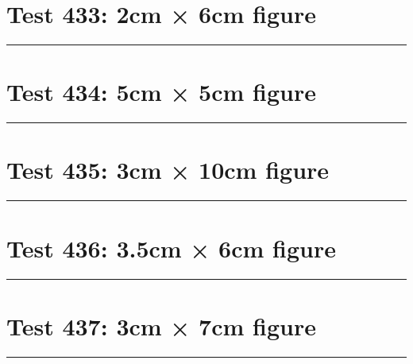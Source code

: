\documentclass[a4paper,11pt]{article}
\begin{document}
\section*{Test 433: 2cm × 6cm figure}
\begin{swarmwrap}%
  \begin{minipage}[t]{2cm}
    \centering
    \rule{\linewidth}{6cm}
  \end{minipage}%
\end{swarmwrap}%
\swarmwrapnext
\lipsum[13]
\lipsum[14]
\lipsum[15]
\lipsum[16]
\section*{Test 434: 5cm × 5cm figure}
\begin{swarmwrap}%
  \begin{minipage}[t]{5cm}
    \centering
    \rule{\linewidth}{5cm}
  \end{minipage}%
\end{swarmwrap}%
\swarmwrapnext
\lipsum[82]
\lipsum[83]
\lipsum[84]
\section*{Test 435: 3cm × 10cm figure}
\begin{swarmwrap}%
  \begin{minipage}[t]{3cm}
    \centering
    \rule{\linewidth}{10cm}
  \end{minipage}%
\end{swarmwrap}%
\swarmwrapnext
\lipsum[141]
\lipsum[142]
\lipsum[143]
\lipsum[144]
\lipsum[145]
\lipsum[146]
\section*{Test 436: 3.5cm × 6cm figure}
\begin{swarmwrap}%
  \begin{minipage}[t]{3cm}
    \centering
    \rule{\linewidth}{6cm}
  \end{minipage}%
\end{swarmwrap}%
\swarmwrapnext
\lipsum[50]
\lipsum[51]
\lipsum[52]
\section*{Test 437: 3cm × 7cm figure}
\begin{swarmwrap}%
  \begin{minipage}[t]{3cm}
    \centering
    \rule{\linewidth}{7cm}
  \end{minipage}%
\end{swarmwrap}%
\swarmwrapnext
\lipsum[86]
\lipsum[87]
\lipsum[88]
\end{document}

